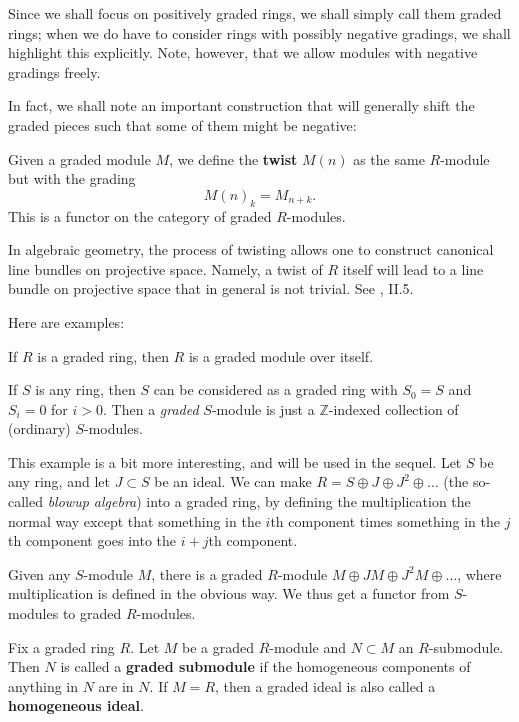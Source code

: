 Since we shall focus on positively graded rings, we shall simply call them
graded rings; when we do have to consider rings with possibly negative
gradings, we shall highlight this explicitly. Note, however, that we allow
modules with negative gradings freely.

In fact, we shall note an important construction that will generally shift
the graded pieces such that some of them might be negative:

\begin{definition} 
Given a graded module $M$, we define the \textbf{twist} $M(n)$ as the
same $R$-module but with the grading
\[  M(n)_k = M_{n+k} . \]  
This is a functor on the category of graded $R$-modules.
\end{definition} 

In algebraic geometry, the process of twisting allows one to construct
canonical line bundles on projective space. Namely, a twist of $R$ itself
will lead to a line bundle on projective space that in general is not
trivial. See \cite{Ha77}, II.5.

Here are examples:
\begin{example} 
If $R$ is  a graded ring, then $R$ is a graded module over itself. 
\end{example} 

\begin{example}
If $S$ is any ring, then $S$ can be considered as a graded ring with $S_0 = S$
and $S_i = 0$ for $i>0$. Then a \emph{graded} $S$-module is just a
$\mathbb{Z}$-indexed collection of (ordinary) $S$-modules.
\end{example} 

\begin{example}
\label{blowupalg}
This example is a bit more interesting, and will be used in the sequel. Let $S$
be any ring, and let $J \subset S$ be an ideal. We can make $R = S \oplus J \oplus
J^2 \oplus \dots$ (the so-called \emph{blowup algebra}) into a graded ring, by defining the multiplication the normal
way except that something in the $i$th component times something in the $j$th
component goes into the $i+j$th component. 

Given any $S$-module $M$, there is a graded $R$-module $M \oplus JM \oplus J^2
M \oplus \dots$, where multiplication is defined in the obvious way. We thus
get a functor from $S$-modules to graded $R$-modules. 	
\end{example} 

\begin{definition} Fix a graded ring $R$.
Let $M$ be a graded $R$-module and $N \subset M$ an $R$-submodule. Then $N$ is
called a
\textbf{graded submodule} if the homogeneous components of anything in $N$ are
in $N$. If $M=R$, then a graded ideal is also called a \textbf{homogeneous
ideal}.
\end{definition} 

